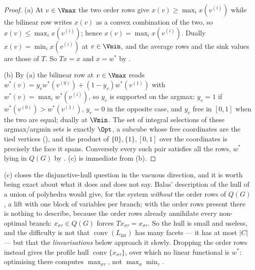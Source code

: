 \begin{proof}
(a) At $v\in\Vmax$ the two order rows give $x(v)\ge\max_ix(v^{(i)})$ while the
bilinear row writes $x(v)$ as a convex combination of the two, so
$x(v)\le\max_ix(v^{(i)})$; hence $x(v)=\max_ix(v^{(i)})$. Dually
$x(v)=\min_ix(v^{(i)})$ at $v\in\Vmin$, and the average rows and the sink
values are those of $T$. So $Tx=x$ and $x=w^{\ast}$ by
.

(b) By (a) the bilinear row at $v\in\Vmax$ reads
$w^{\ast}(v)=y_vw^{\ast}(v^{(0)})+(1-y_v)w^{\ast}(v^{(1)})$ with
$w^{\ast}(v)=\max_iw^{\ast}(v^{(i)})$, so $y_v$ is supported on the argmax:
$y_v=1$ if $w^{\ast}(v^{(0)})>w^{\ast}(v^{(1)})$, $y_v=0$ in the opposite case,
and $y_v$ free in $[0,1]$ when the two are equal; dually at $\Vmin$. The set of
integral selections of these argmax/argmin sets is exactly $\Opt$, a subcube
whose free coordinates are the tied vertices (), and the
product of $\{0\},\{1\},[0,1]$ over the coordinates is precisely the face it
spans. Conversely every such pair satisfies all the rows, $w^{\ast}$ lying in
$Q(G)$ by . (c) is immediate from (b).
\end{proof}

\begin{remark}\label{cl:hull-reading}
(c) closes the disjunctive-hull question in the vacuous
direction, and it is worth being exact about what it does and does not say.
Balas' description of the hull of a union of polyhedra would give, for the
system \emph{without} the order rows of $Q(G)$, a lift with one block of
variables per branch; with the order rows present there is nothing to
describe, because the order rows already annihilate every non-optimal branch:
$x_{\sigma\tau}\in Q(G)$ forces $Tx_{\sigma\tau}=x_{\sigma\tau}$. So the hull
is small and useless, and the difficulty is not that $\operatorname{conv}
(L_{\mathrm{int}})$ has many facets --- it has at most $|C|$ --- but that the
\emph{linearisations} below approach it slowly. Dropping the order rows
instead gives the profile hull $\operatorname{conv}\{x_{\sigma\tau}\}$, over
which no linear functional is $w^{\ast}$: optimising there computes
$\max_{\sigma\tau}$, not $\max_\sigma\min_\tau$.
\end{remark}

